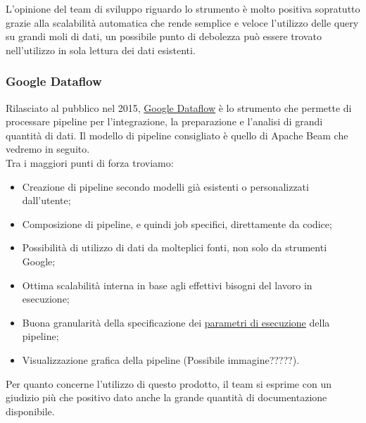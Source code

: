 L'opinione del team di sviluppo riguardo lo strumento è molto positiva sopratutto grazie alla scalabilità automatica che rende semplice e veloce l'utilizzo delle query su grandi moli di dati, un possibile punto di debolezza può essere trovato nell'utilizzo in sola lettura dei dati esistenti.
\subsubsection{Google Dataflow}
Rilasciato al pubblico nel 2015, \href{https://cloud.google.com/dataflow/}{Google Dataflow} è lo strumento che permette di processare pipeline per l'integrazione, la preparazione e l'analisi di grandi quantità di dati.
Il modello di pipeline consigliato è quello di Apache Beam che vedremo in seguito.
\\ Tra i maggiori punti di forza troviamo:
\begin{itemize}
	\item Creazione di pipeline secondo modelli già esistenti o personalizzati dall'utente;
	\item Composizione di pipeline, e quindi job specifici, direttamente da codice;
	\item Possibilità di utilizzo di dati da molteplici fonti, non solo da strumenti Google;
	\item Ottima scalabilità interna in base agli effettivi bisogni del lavoro in esecuzione;
	\item Buona granularità della specificazione dei \href{https://cloud.google.com/dataflow/docs/guides/specifying-exec-params?authuser=2\&hl=it}{parametri di esecuzione} della pipeline;
	\item Visualizzazione grafica della pipeline (Possibile immagine?????). 
\end{itemize}
Per quanto concerne l'utilizzo di questo prodotto, il team si esprime con un giudizio più che positivo dato anche la grande quantità di documentazione disponibile.
